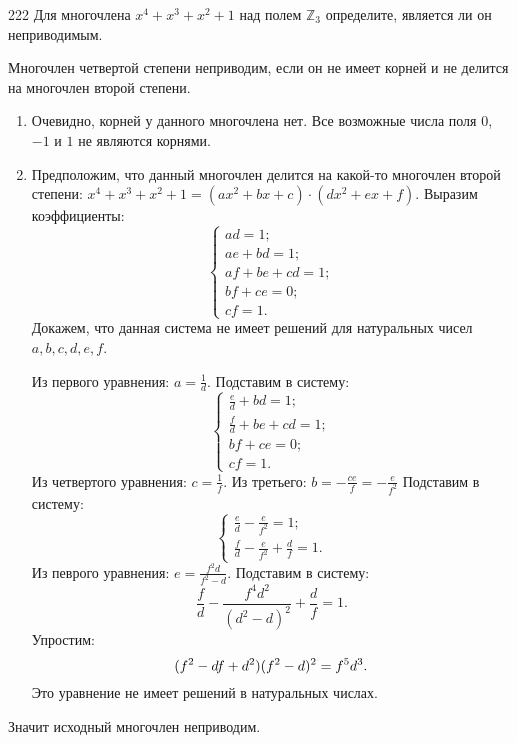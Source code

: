 \begin{task}{222}
Для многочлена $x^4 + x^3 + x^2 + 1$ над полем $\mathbb{Z}_3$ определите, является ли он неприводимым.
\end{task}

\begin{solution}
Многочлен четвертой степени неприводим, если он не имеет корней и не делится на многочлен второй степени.
\begin{enumerate}
\item Очевидно, корней у данного многочлена нет. Все возможные числа поля $0$, $-1$ и $1$ не являются корнями.

\item Предположим, что данный многочлен делится на какой-то многочлен второй степени: $x^4 + x^3 + x^2 + 1 = (ax^2 + bx + c)\cdot(dx^2 + ex + f)$. Выразим коэффициенты:
\begin{equation*}
    \begin{cases}
        ad = 1;\\
        ae + bd = 1;\\
        af + be + cd = 1;\\
        bf + ce = 0;\\
        cf = 1.
    \end{cases}
\end{equation*}
Докажем, что данная система не имеет решений для натуральных чисел $a, b, c, d, e, f$.\par
Из первого уравнения: $a = \frac{1}{d}$. Подставим в систему:
\begin{equation*}
    \begin{cases}
        \frac{e}{d} + bd = 1;\\
        \frac{f}{d} + be + cd = 1;\\
        bf + ce = 0;\\
        cf = 1.
    \end{cases}
\end{equation*}
Из четвертого уравнения: $c = \frac{1}{f}$. Из третьего: $b = -\frac{ce}{f} = -\frac{e}{f^2}$ Подставим в систему:
\begin{equation*}
    \begin{cases}
        \frac{e}{d} - \frac{e}{f^2} = 1;\\
        \frac{f}{d} - \frac{e}{f^2} + \frac{d}{f} = 1.
    \end{cases}
\end{equation*}
Из певрого уравнения: $e = \frac{f^2d}{f^2 - d}$. Подставим в систему:
\begin{equation*}
     \frac{f}{d} - \frac{f^4d^2}{(d^2-d)^2} + \frac{d}{f} = 1.
\end{equation*}
Упростим:
\begin{equation*}
     (f^2 - df +d^2)(f^2 - d)^2 = f^5d^3\\.
\end{equation*}
Это уравнение не имеет решений в натуральных числах.
\end{enumerate}
\par Значит исходный многочлен неприводим.
\end{solution}